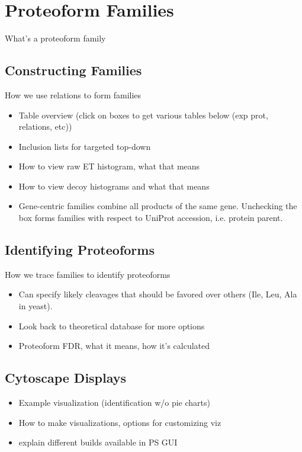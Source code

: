 
\section{Proteoform Families}
What's a proteoform family

\subsection{Constructing Families}
How we use relations to form families
\begin{itemize}
	\item Table overview (click on boxes to get various tables below (exp prot, relations, etc))
	\item Inclusion lists for targeted top-down
	\item How to view raw ET histogram, what that means
	\item How to view decoy histograms and what that means
	\item Gene-centric families combine all products of the same gene. Unchecking the box forms families with respect to UniProt accession, i.e. protein parent.
\end{itemize}

\subsection{Identifying Proteoforms}
How we trace families to identify proteoforms
\begin{itemize}
	\item Can specify likely cleavages that should be favored over others (Ile, Leu, Ala in yeast).
	\item Look back to theoretical database for more options
	\item Proteoform FDR, what it means, how it's calculated
\end{itemize}

\subsection{Cytoscape Displays}
\begin{itemize}
	\item Example visualization (identification w/o pie charts)
	\item How to make visualizations, options for customizing viz
	\item explain different builds available in PS GUI
\end{itemize}



